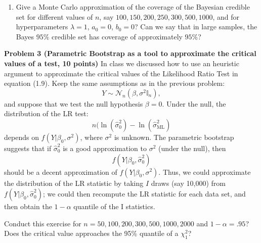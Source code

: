 \documentclass[11pt]{article} %
\begin{document}
\begin{enumerate}
\begin{enumerate}
\item Give a Monte Carlo approximation of the coverage of the Bayesian credible set for different values of $n$, say $100, 150, 200, 250, 300, 500, 1000$, and for hyperparameters $\lambda=1$, $a_0=0$, $b_0=0$? Can we say that in large samples, the Bayes $95\%$ credible set has coverage of approximately $95\%$?

\end{enumerate}

\noindent \textbf{Problem 3 (Parametric Bootstrap as a tool to approximate the critical values of a test, 10 points)} In class we discussed how to use an heuristic argument to approximate the critical values of the Likelihood Ratio Test in equation (1.9). Keep the same assumptions as in the previous problem:
\[ Y \sim \mathcal{N}_n(\beta, \sigma^2 \mathbb{I}_n), \]
 and suppose that we test the null hypothesis $\beta = 0$.  Under the null, the distribution of the LR test:
 $$ n (\ln (\widehat{\sigma}^2_0) - \ln(\widehat{\sigma}^2_{\textrm{ML}}) $$
depends on $f(Y | \beta_0, \sigma^2)$, where $\sigma^2$ is unknown. The parametric bootstrap suggests that if $\widehat{\sigma}^2_{0}$ is a good approximation to $\sigma^2$ (under the null), then  $$f(Y | \beta_0, \widehat{\sigma}^2_{0})$$
should be a decent approximation of $f(Y | \beta_0 , \sigma^2)$. Thus, we could approximate the distribution of the LR statistic by taking $I$ draws (say 10,000) from $f(Y | \beta_0, \widehat{\sigma}^2_{0})$; we could then recompute the LR statistic for each data set, and then obtain the $1-\alpha$ quantile of the I statistics. 

Conduct this exercise for $n=50,100,200, 300, 500,  1000, 2000$ and $1-\alpha= .95$? Does the critical value approaches the 95\% quantile of a $\chi^2_1$?


\end{enumerate}




\end{document}
